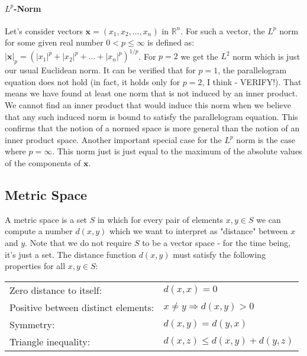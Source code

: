 \paragraph{$L^p$-Norm} Let's consider vectors $\mathbf{x} = (x_1, x_2, \ldots, x_n)$ in $\mathbb{R}^n$. For such a vector, the $L^p$ norm for some given real number $0 < p \leq \infty$ is defined as: $ |\mathbf{x}|_p = (|x_1|^p + |x_2|^p + \ldots + |x_n|^p)^{1/p}$. For $p=2$ we get the $L^2$ norm which is just our usual Euclidean norm. It can be verified that for $p=1$, the parallelogram equation does not hold (in fact, it holds only for $p = 2$, I think - VERIFY!). That means we have found at least one norm that is not induced by an inner product. We cannot find an inner product that would induce this norm when we believe that any such induced norm is bound to satisfy the parallelogram equation. This confirms that the notion of a normed space is more general than the notion of an inner product space. Another important special case for the $L^p$ norm is the case where $p = \infty$. This norm just is just equal to the maximum of the absolute values of the components of $\mathbf{x}$.






\subsection{Metric Space}
A metric space is a set $S$ in which for every pair of elements $x,y \in S$ we can compute a number $d(x,y)$ which we want to interpret as "distance" between $x$ and $y$. Note that we do not require $S$ to be a vector space - for the time being, it's just a set. The distance function $d(x,y)$ must satisfy the following properties for all $x,y \in S$:

\medskip
\begin{tabular}{l l}
Zero distance to itself:            & $d(x, x) = 0$  \\
Positive between distinct elements: & $x \neq y \Rightarrow d(x,y) > 0$  \\
Symmetry:                           & $d(x, y) = d(y, x)$  \\
Triangle inequality:                & $d(x,z) \leq d(x,y) + d(y,z)$
\end{tabular}
\medskip

